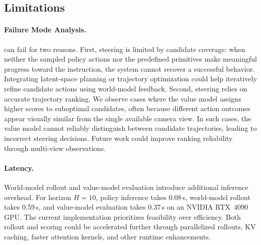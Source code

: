 \subsection{Limitations}
\label{sec:limitations}




\paragraph{Failure Mode Analysis.}
\coolname{} can fail for two reasons. First, steering is limited by candidate coverage: when neither the sampled policy actions nor the predefined primitives make meaningful progress toward the instruction, the system cannot recover a successful behavior. Integrating latent-space planning or trajectory optimization could help iteratively refine candidate actions using world-model feedback. Second, steering relies on accurate trajectory ranking. We observe cases where the value model assigns higher scores to suboptimal candidates, often because different action outcomes appear visually similar from the single available camera view. In such cases, the value model cannot reliably distinguish between candidate trajectories, leading to incorrect steering decisions. Future work could improve ranking reliability through multi-view observations.





\paragraph{Latency.}
World-model rollout and value-model evaluation introduce additional inference overhead. For horizon $H{=}10$, policy inference takes 0.08\,s, world-model rollout takes 0.59\,s, and value-model evaluation takes 0.37\,s on an NVIDIA RTX~4090 GPU. The current implementation prioritizes feasibility over efficiency. Both rollout and scoring could be accelerated further through parallelized rollouts, KV caching, faster attention kernels, and other runtime enhancements.


